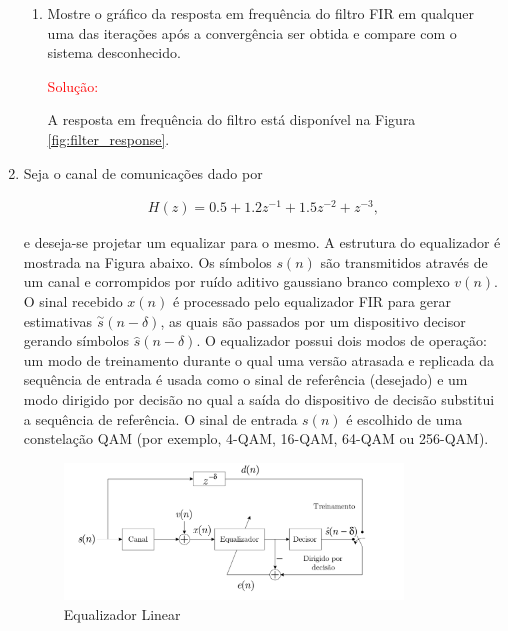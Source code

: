 \documentclass[a4paper,10pt]{article}
\begin{document}
\begin{enumerate}
\begin{enumerate}
					\item Mostre o gráﬁco da resposta em frequência do ﬁltro FIR em qualquer uma das iterações após a convergência ser obtida e compare com o sistema desconhecido.
					
						\textcolor{red}{Solução:}

						A resposta em frequência do filtro está disponível na Figura \ref{fig:filter_response}. 

				\end{enumerate}
			
			\item Seja o canal de comunicações dado por
			
				\begin{align}
					H(z) = 0.5 + 1.2z^{-1} + 1.5z^{-2} + z^{-3},
				\end{align}
				
				e deseja-se projetar um equalizar para o mesmo. A estrutura do equalizador é mostrada na Figura abaixo. Os símbolos $s(n)$ são transmitidos através de um canal e corrompidos por ruído aditivo gaussiano branco complexo $v(n)$. O sinal recebido $x(n)$ é processado pelo equalizador FIR para gerar estimativas $\overset{\sim}{s}(n - \delta)$, as quais são passados por um dispositivo decisor gerando  símbolos $\hat{s}(n - \delta)$. O equalizador possui dois modos de operação: um modo de treinamento durante o qual uma versão atrasada e  replicada da sequência de entrada é usada como o sinal de referência (desejado) e um modo dirigido por decisão no qual a saída do dispositivo de decisão substitui a sequência de referência. O sinal de entrada $s(n)$ é escolhido de uma constelação QAM (por exemplo, 4-QAM, 16-QAM, 64-QAM ou 256-QAM).
				
				\begin{figure}[!ht]
					\centering
					\includegraphics[width=0.85\textwidth]{figs/equalizador_linear.png}
					\caption{Equalizador Linear}
				\end{figure}
			
				\begin{enumerate}
					

\end{enumerate}
\end{enumerate}
\end{document}
